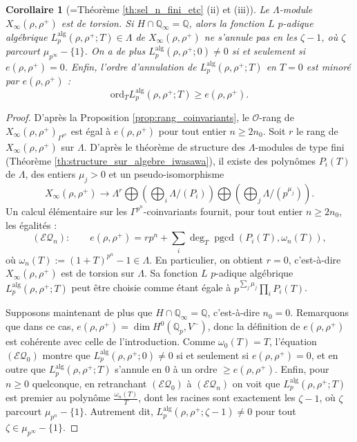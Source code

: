 \documentclass[12pt]{amsart}
\newcommand\bQ{\mathbb{Q}}
\newcommand\cO{\mathcal{O}}
\newcommand{\ord}{\mathrm{ord}}
\newcommand{\alg}{\textrm{alg}}
\DeclareMathOperator{\pgcd}{pgcd}
\theoremstyle{defstyle}
\theoremstyle{thmstyle}
\newtheorem{corollaire}[subsubsection]{Corollaire}
\begin{document}
\begin{corollaire}[=Théorème \ref{th:sel_n_fini_etc} (ii) et (iii)]\label{coro:sel_infty_torsion+zéros_triviaux}
	Le $\Lambda$-module $X_\infty(\rho,\rho^+)$ est de torsion. Si $H\cap \bQ_\infty =\bQ$, alors la fonction $L$ $p$-adique algébrique $L_p^{\alg}(\rho,\rho^+;T) \in \Lambda$ de $X_\infty(\rho,\rho^+)$ ne s'annule pas en les $\zeta-1$, où $\zeta$ parcourt $\mu_{p^\infty}-\{1\}$. On a de plus $L_p^{\alg}(\rho,\rho^+;0) \neq 0 $ si et seulement si $e(\rho,\rho^+)=0$. Enfin, l'ordre d'annulation de $L_p^{\alg}(\rho,\rho^+;T)$ en $T=0$ est minoré par $e(\rho,\rho^+)$ :
	$$\ord_{T} L_p^{\alg}(\rho,\rho^+;T) \geq e(\rho,\rho^+).$$
\end{corollaire}

\begin{proof}
	D'après la Proposition \ref{prop:rang_coinvariants}, le $\cO$-rang de $X_\infty(\rho,\rho^+)_{\Gamma^{p^n}}$ est égal à $e(\rho,\rho^+)$ pour tout entier $n\geq 2n_0$. Soit $r$ le rang de $X_\infty(\rho,\rho^+)$ sur $\Lambda$. D'après le théorème de structure des $\Lambda$-modules de type fini (Théorème \ref{th:structure_sur_algebre_iwasawa}), il existe des polynômes $P_i(T)$ de $\Lambda$, des entiers $\mu_j>0$ et un pseudo-isomorphisme
	$$ X_\infty(\rho,\rho^+) \longrightarrow \Lambda^r \bigoplus \left( \bigoplus_i \Lambda / (P_i) \right) \bigoplus \left( \bigoplus_j \Lambda / (p^{\mu_j}) \right). $$
	Un calcul élémentaire sur les $\Gamma^{p^n}$-coinvariants fournit, pour tout entier $n\geq 2 n_0$, les égalités : 
	$$(\mathcal{EQ}_n) : \qquad e(\rho,\rho^+) = rp^n + \sum_i \deg_T \pgcd(P_i(T),\omega_n(T)),$$
	où $\omega_n(T):=(1+T)^{p^n}-1\in \Lambda$. En particulier, on obtient $r=0$, c'est-à-dire $X_\infty(\rho,\rho^+)$  est de torsion sur $\Lambda$. Sa fonction $L$ $p$-adique algébrique $L_p^{\alg}(\rho,\rho^+;T)$ peut être choisie comme étant égale à $p^{\sum_j \mu_j} \prod_i P_i(T)$. 
	
	Supposons maintenant de plus que $H\cap \bQ_\infty =\bQ$, c'est-à-dire $n_0=0$. Remarquons que dans ce cas, $e(\rho,\rho^+)=\dim H^0(\bQ_p,V^-)$, donc la définition de $e(\rho,\rho^+)$ est cohérente avec celle de l'introduction. Comme $\omega_0(T)=T$, l'équation $(\mathcal{EQ}_0)$ montre que $L_p^{\alg}(\rho,\rho^+;0)\neq 0$ si et seulement si $e(\rho,\rho^+)=0$, et en outre que $L_p^{\alg}(\rho,\rho^+;T)$ s'annule en 0 à un ordre $\geq e(\rho,\rho^+)$. Enfin, pour $n\geq 0$ quelconque, en retranchant $(\mathcal{EQ}_0)$ à $(\mathcal{EQ}_n)$ on voit que $L_p^{\alg}(\rho,\rho^+;T)$ est premier au polynôme $\frac{\omega_n(T)}{T}$, dont les racines sont exactement les $\zeta-1$, où $\zeta$ parcourt $\mu_{p^n}-\{1\}$.  Autrement dit, $L_p^{\alg}(\rho,\rho^+;\zeta-1) \neq 0$ pour tout $\zeta \in \mu_{p^\infty}-\{1\}$.
\end{proof}
\end{document}

